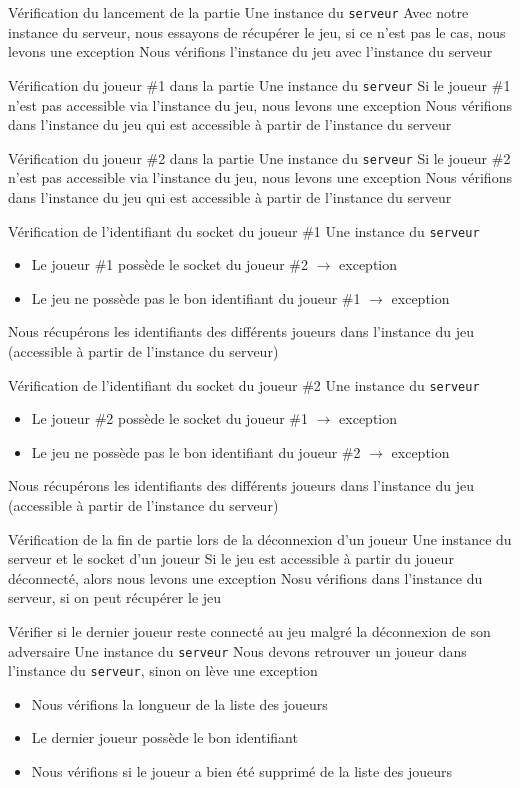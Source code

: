 \mytest
{Vérification du lancement de la partie}
{Une instance du \texttt{serveur}}
{Avec notre instance du serveur, nous essayons de récupérer le jeu, si ce n'est pas le cas, nous levons une exception}
{Nous vérifions l'instance du jeu avec l'instance du serveur}

\mytest
{Vérification du joueur \#1 dans la partie}
{Une instance du \texttt{serveur}}
{Si le joueur \#1 n'est pas accessible via l'instance du jeu, nous levons une exception}
{Nous vérifions dans l'instance du jeu qui est accessible à partir de l'instance du serveur}

\mytest
{Vérification du joueur \#2 dans la partie}
{Une instance du \texttt{serveur}}
{Si le joueur \#2 n'est pas accessible via l'instance du jeu, nous levons une exception}
{Nous vérifions dans l'instance du jeu qui est accessible à partir de l'instance du serveur}

\mytest
{Vérification de l'identifiant du socket du joueur \#1}
{Une instance du \texttt{serveur}}
{
    \begin{itemize}
        \item Le joueur \#1 possède le socket du joueur \#2 $\rightarrow$ exception
        \item Le jeu ne possède pas le bon identifiant du joueur \#1 $\rightarrow$ exception
    \end{itemize}
}
{Nous récupérons les identifiants des différents joueurs dans l'instance du jeu (accessible à partir de l'instance du serveur)}

\mytest
{Vérification de l'identifiant du socket du joueur \#2}
{Une instance du \texttt{serveur}}
{
    \begin{itemize}
        \item Le joueur \#2 possède le socket du joueur \#1 $\rightarrow$ exception
        \item Le jeu ne possède pas le bon identifiant du joueur \#2 $\rightarrow$ exception
    \end{itemize}
}
{Nous récupérons les identifiants des différents joueurs dans l'instance du jeu (accessible à partir de l'instance du serveur)}

\mytest
{Vérification de la fin de partie lors de la déconnexion d'un joueur}
{Une instance du serveur et le socket d'un joueur}
{Si le jeu est accessible à partir du joueur déconnecté, alors nous levons une exception}
{Nosu vérifions dans l'instance du serveur, si on peut récupérer le jeu}

\mytest
{Vérifier si le dernier joueur reste connecté au jeu malgré la déconnexion de son adversaire}
{Une instance du \texttt{serveur}}
{Nous devons retrouver un joueur dans l'instance du \texttt{serveur}, sinon on lève une exception}
{
    \begin{itemize}
        \item Nous vérifions la longueur de la liste des joueurs
        \item Le dernier joueur possède le bon identifiant
        \item Nous vérifions si le joueur a bien été supprimé de la liste des joueurs
    \end{itemize}
}

